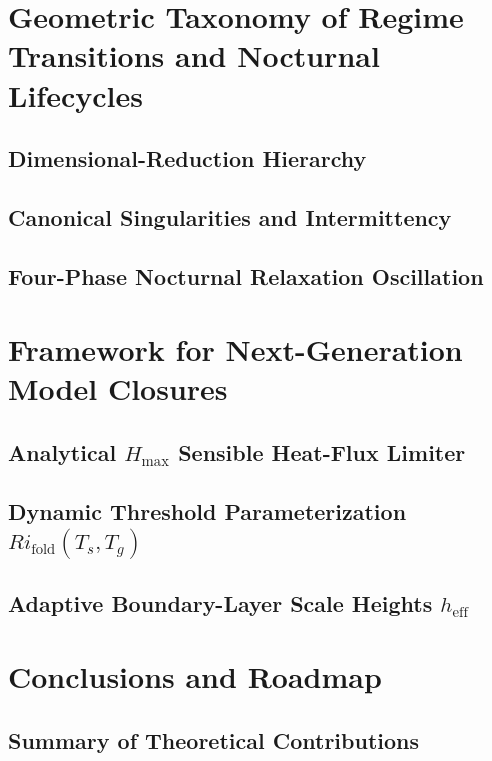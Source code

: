 \documentclass[11pt,letterpaper]{article}
\begin{document}
\section{Geometric Taxonomy of Regime Transitions and Nocturnal Lifecycles}
\label{sec:taxonomy}

\subsection{Dimensional-Reduction Hierarchy}

\subsection{Canonical Singularities and Intermittency}

\subsection{Four-Phase Nocturnal Relaxation Oscillation}

\section{Framework for Next-Generation Model Closures}
\label{sec:closures}

\subsection{Analytical $H_{\max}$ Sensible Heat-Flux Limiter}

\subsection{Dynamic Threshold Parameterization $Ri_{\text{fold}}(T_s, T_g)$}

\subsection{Adaptive Boundary-Layer Scale Heights $h_{\text{eff}}$}

\section{Conclusions and Roadmap}
\label{sec:conclusion}

\subsection{Summary of Theoretical Contributions}
\end{document}
